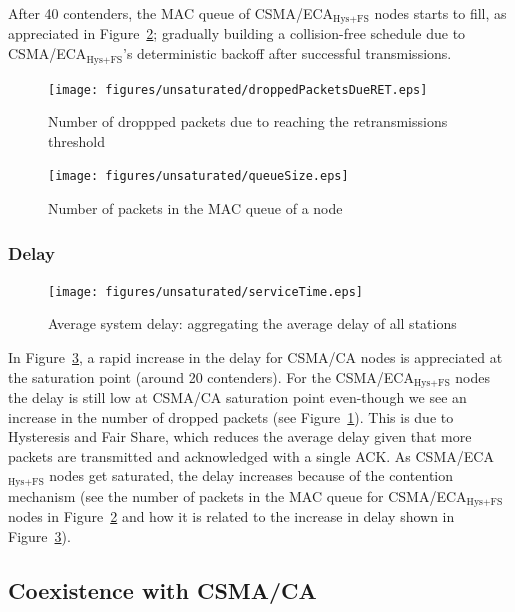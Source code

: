 \documentclass[a4paper,journal]{IEEEtran}
\begin{document}
	After 40 contenders, the MAC queue of CSMA/ECA$_{\text{Hys+FS}}$ nodes starts to fill, as appreciated in Figure~\ref{fig:MacQ}; gradually building a collision-free schedule due to CSMA/ECA$_{\text{Hys+FS}}$'s deterministic backoff after successful transmissions.
	
   	\begin{figure}[tb]
		\centering
		\texttt{[image: figures/unsaturated/droppedPacketsDueRET.eps]}
		\caption{Number of droppped packets due to reaching the retransmissions threshold}
		\label{fig:droppedDueToRET}
	\end{figure}
	
	 \begin{figure}[tb]
		\centering
		\texttt{[image: figures/unsaturated/queueSize.eps]}
		\caption{Number of packets in the MAC queue of a node}
		\label{fig:MacQ}
	\end{figure}
	
	\subsubsection{Delay}
	
	\begin{figure}[tb]
		\centering
		\texttt{[image: figures/unsaturated/serviceTime.eps]}
		\caption{Average system delay: aggregating the average delay of all stations}
		\label{fig:serviceTime-unsat}
	\end{figure}
	
	In Figure~\ref{fig:serviceTime-unsat}, a rapid increase in the delay for CSMA/CA nodes is appreciated at the saturation point (around 20 contenders). For the CSMA/ECA$_{\text{Hys+FS}}$ nodes the delay is still low at CSMA/CA saturation point even-though we see an increase in the number of dropped packets (see Figure~\ref{fig:droppedDueToRET}). This is due to Hysteresis and Fair Share, which reduces the average delay given that more packets are transmitted and acknowledged with a single ACK. As CSMA/ECA$_{\text{Hys+FS}}$ nodes get saturated, the delay increases because of the contention mechanism (see the number of packets in the MAC queue for CSMA/ECA$_{\text{Hys+FS}}$ nodes in Figure~\ref{fig:MacQ} and how it is related to the increase in delay shown in Figure~\ref{fig:serviceTime-unsat}).\\	

	\subsection{Coexistence with CSMA/CA}
	
\end{document}
